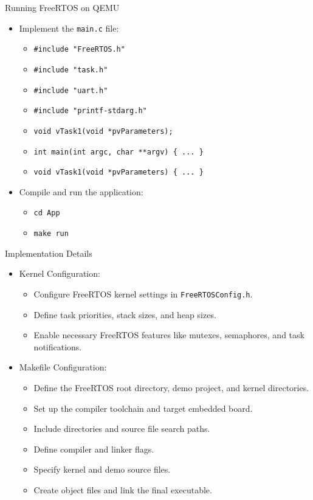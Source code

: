 \begin{frame}{Running FreeRTOS on QEMU}
    \begin{itemize}
        \item Implement the \texttt{main.c} file:
        \begin{itemize}
            \item \texttt{\#include "FreeRTOS.h"}
            \item \texttt{\#include "task.h"}
            \item \texttt{\#include "uart.h"}
            \item \texttt{\#include "printf-stdarg.h"}
            \item \texttt{void vTask1(void *pvParameters);}
            \item \texttt{int main(int argc, char **argv) \{ ... \}}
            \item \texttt{void vTask1(void *pvParameters) \{ ... \}}
        \end{itemize}
        \item Compile and run the application:
        \begin{itemize}
            \item \texttt{cd App}
            \item \texttt{make run}
        \end{itemize}
    \end{itemize}
\end{frame}

\begin{frame}{Implementation Details}
    \begin{itemize}
        \item Kernel Configuration:
        \begin{itemize}
            \item Configure FreeRTOS kernel settings in \texttt{FreeRTOSConfig.h}.
            \item Define task priorities, stack sizes, and heap sizes.
            \item Enable necessary FreeRTOS features like mutexes, semaphores, and task notifications.
        \end{itemize}
        \item Makefile Configuration:
        \begin{itemize}
            \item Define the FreeRTOS root directory, demo project, and kernel directories.
            \item Set up the compiler toolchain and target embedded board.
            \item Include directories and source file search paths.
            \item Define compiler and linker flags.
            \item Specify kernel and demo source files.
            \item Create object files and link the final executable.
        \end{itemize}
    \end{itemize}
\end{frame}
